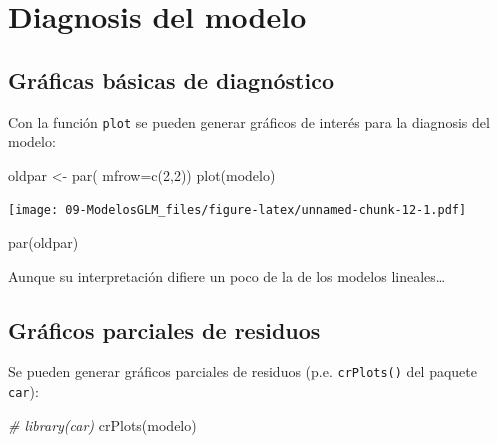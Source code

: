 \documentclass[
]{book}
\newenvironment{Shaded}{\begin{snugshade}}{\end{snugshade}}
\newcommand{\AttributeTok}[1]{\textcolor[rgb]{0.77,0.63,0.00}{#1}}
\newcommand{\CommentTok}[1]{\textcolor[rgb]{0.56,0.35,0.01}{\textit{#1}}}
\newcommand{\DecValTok}[1]{\textcolor[rgb]{0.00,0.00,0.81}{#1}}
\newcommand{\FunctionTok}[1]{\textcolor[rgb]{0.00,0.00,0.00}{#1}}
\newcommand{\NormalTok}[1]{#1}
\newcommand{\OtherTok}[1]{\textcolor[rgb]{0.56,0.35,0.01}{#1}}
\theoremstyle{break}
\begin{document}
\hypertarget{diagnosis-del-modelo-1}{%
\section{Diagnosis del modelo}\label{diagnosis-del-modelo-1}}

\hypertarget{gruxe1ficas-buxe1sicas-de-diagnuxf3stico-1}{%
\subsection{Gráficas básicas de diagnóstico}\label{gruxe1ficas-buxe1sicas-de-diagnuxf3stico-1}}

Con la función \texttt{plot} se pueden generar gráficos de interés para la diagnosis del modelo:

\begin{Shaded}
\begin{Highlighting}[]
\NormalTok{oldpar }\OtherTok{\textless{}{-}} \FunctionTok{par}\NormalTok{( }\AttributeTok{mfrow=}\FunctionTok{c}\NormalTok{(}\DecValTok{2}\NormalTok{,}\DecValTok{2}\NormalTok{))}
\FunctionTok{plot}\NormalTok{(modelo)}
\end{Highlighting}
\end{Shaded}

\texttt{[image: 09-ModelosGLM\_files/figure-latex/unnamed-chunk-12-1.pdf]}

\begin{Shaded}
\begin{Highlighting}[]
\FunctionTok{par}\NormalTok{(oldpar)}
\end{Highlighting}
\end{Shaded}

Aunque su interpretación difiere un poco de la de los modelos lineales\ldots{}

\hypertarget{gruxe1ficos-parciales-de-residuos-1}{%
\subsection{Gráficos parciales de residuos}\label{gruxe1ficos-parciales-de-residuos-1}}

Se pueden generar gráficos parciales de residuos (p.e. \texttt{crPlots()} del paquete \texttt{car}):

\begin{Shaded}
\begin{Highlighting}[]
\CommentTok{\# library(car)}
\FunctionTok{crPlots}\NormalTok{(modelo)}
\end{Highlighting}
\end{Shaded}
\end{document}
